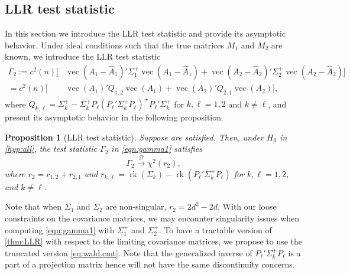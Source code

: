 \documentclass[12pt]{article}
\numberwithin{equation}{section}
\numberwithin{table}{section}
\numberwithin{thm}{section}
\numberwithin{defn}{section}
\numberwithin{lem}{section}
\newtheorem{prop}{Proposition}
\numberwithin{prop}{section}
\numberwithin{cor}{section}
\numberwithin{rem}{section}
\DeclareMathOperator{\Vector}{vec}
\newcommand{\rank}{\operatorname{rk}}
\begin{document}
\begin{appendix}
\subsection{LLR test statistic}\label{sec:llrintro}
In this section we introduce the LLR test statistic and provide its asymptotic behavior.
Under ideal conditions such that the true matrices $M_1$ and $M_2$ are known, we introduce the LLR test statistic
\begin{equation}\label{eqn:gamma1}
\begin{aligned}
    \Gamma_2 := c^2(n) \Big[ & \Vector(A_1 - \widehat{A}_1)' \Sigma_1^+ \Vector(A_1 - \widehat{A}_1) + \Vector(A_2 - \widehat{A}_2)' \Sigma_2^+ \Vector(A_2 - \widehat{A}_2)\Big]\\
    = c^2(n) \Big[ & \Vector (A_1)' Q_{1,2} \Vector(A_1) + \Vector(A_2)' Q_{2,1} \Vector(A_2)\Big],
\end{aligned}
\end{equation}
where $Q_{k,\ell} = \Sigma_k^+ - \Sigma_k^+ P_\ell (P_\ell' \Sigma_k^+ P_\ell)^+ P_\ell' \Sigma_k^+$ for $k, \ell = 1, 2$ and $k \ne \ell$,
and present its asymptotic behavior in the following proposition.
\begin{prop}[LLR test statistic]\label{thm:LLR}
Suppose  are satisfied. Then, under $H_0$ in \eqref{hyp:all}, the test statistic $\Gamma_2$ in \eqref{eqn:gamma1} satisfies
\begin{equation}\label{eqn:projTest}
    \Gamma_2 \xrightarrow{\mathcal{D}} \chi^2(r_2),
\end{equation}
where $r_2 = r_{1,2} + r_{2,1}$ and $r_{k,\ell} = \rank(\Sigma_k) - \rank(P_{\ell}' \Sigma_k^+ P_{\ell})$ for $k, \ell = 1,2$, and $k \neq \ell$.
\end{prop}


Note that when $\Sigma_1$ and $\Sigma_2$ are non-singular, $r_2 = 2d^2 - 2d$.
With our loose constraints on the covariance matrices, we may encounter singularity issues when computing \eqref{eqn:gamma1} with $\Sigma_1^+$ and $\Sigma_2^+$. To have a tractable version of \autoref{thm:LLR} with respect to the limiting covariance matrices, we propose to use the truncated version \eqref{eq:wald.cmt}. Note that the generalized inverse of $P_\ell' \Sigma_k^+ P_\ell$ is a part of a projection matrix hence will not have the same discontinuity concerns.


\end{appendix}
\end{document}
